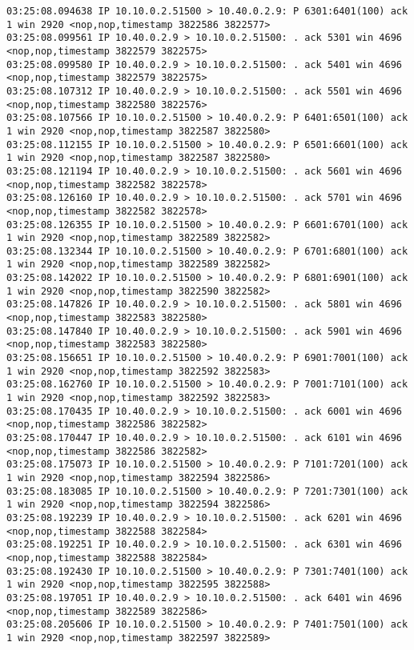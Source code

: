 \documentclass[a4paper,12pt]{article}
\begin{document}
\begin{lstlisting}
03:25:08.094638 IP 10.10.0.2.51500 > 10.40.0.2.9: P 6301:6401(100) ack 1 win 2920 <nop,nop,timestamp 3822586 3822577>
03:25:08.099561 IP 10.40.0.2.9 > 10.10.0.2.51500: . ack 5301 win 4696 <nop,nop,timestamp 3822579 3822575>
03:25:08.099580 IP 10.40.0.2.9 > 10.10.0.2.51500: . ack 5401 win 4696 <nop,nop,timestamp 3822579 3822575>
03:25:08.107312 IP 10.40.0.2.9 > 10.10.0.2.51500: . ack 5501 win 4696 <nop,nop,timestamp 3822580 3822576>
03:25:08.107566 IP 10.10.0.2.51500 > 10.40.0.2.9: P 6401:6501(100) ack 1 win 2920 <nop,nop,timestamp 3822587 3822580>
03:25:08.112155 IP 10.10.0.2.51500 > 10.40.0.2.9: P 6501:6601(100) ack 1 win 2920 <nop,nop,timestamp 3822587 3822580>
03:25:08.121194 IP 10.40.0.2.9 > 10.10.0.2.51500: . ack 5601 win 4696 <nop,nop,timestamp 3822582 3822578>
03:25:08.126160 IP 10.40.0.2.9 > 10.10.0.2.51500: . ack 5701 win 4696 <nop,nop,timestamp 3822582 3822578>
03:25:08.126355 IP 10.10.0.2.51500 > 10.40.0.2.9: P 6601:6701(100) ack 1 win 2920 <nop,nop,timestamp 3822589 3822582>
03:25:08.132344 IP 10.10.0.2.51500 > 10.40.0.2.9: P 6701:6801(100) ack 1 win 2920 <nop,nop,timestamp 3822589 3822582>
03:25:08.142022 IP 10.10.0.2.51500 > 10.40.0.2.9: P 6801:6901(100) ack 1 win 2920 <nop,nop,timestamp 3822590 3822582>
03:25:08.147826 IP 10.40.0.2.9 > 10.10.0.2.51500: . ack 5801 win 4696 <nop,nop,timestamp 3822583 3822580>
03:25:08.147840 IP 10.40.0.2.9 > 10.10.0.2.51500: . ack 5901 win 4696 <nop,nop,timestamp 3822583 3822580>
03:25:08.156651 IP 10.10.0.2.51500 > 10.40.0.2.9: P 6901:7001(100) ack 1 win 2920 <nop,nop,timestamp 3822592 3822583>
03:25:08.162760 IP 10.10.0.2.51500 > 10.40.0.2.9: P 7001:7101(100) ack 1 win 2920 <nop,nop,timestamp 3822592 3822583>
03:25:08.170435 IP 10.40.0.2.9 > 10.10.0.2.51500: . ack 6001 win 4696 <nop,nop,timestamp 3822586 3822582>
03:25:08.170447 IP 10.40.0.2.9 > 10.10.0.2.51500: . ack 6101 win 4696 <nop,nop,timestamp 3822586 3822582>
03:25:08.175073 IP 10.10.0.2.51500 > 10.40.0.2.9: P 7101:7201(100) ack 1 win 2920 <nop,nop,timestamp 3822594 3822586>
03:25:08.183085 IP 10.10.0.2.51500 > 10.40.0.2.9: P 7201:7301(100) ack 1 win 2920 <nop,nop,timestamp 3822594 3822586>
03:25:08.192239 IP 10.40.0.2.9 > 10.10.0.2.51500: . ack 6201 win 4696 <nop,nop,timestamp 3822588 3822584>
03:25:08.192251 IP 10.40.0.2.9 > 10.10.0.2.51500: . ack 6301 win 4696 <nop,nop,timestamp 3822588 3822584>
03:25:08.192430 IP 10.10.0.2.51500 > 10.40.0.2.9: P 7301:7401(100) ack 1 win 2920 <nop,nop,timestamp 3822595 3822588>
03:25:08.197051 IP 10.40.0.2.9 > 10.10.0.2.51500: . ack 6401 win 4696 <nop,nop,timestamp 3822589 3822586>
03:25:08.205606 IP 10.10.0.2.51500 > 10.40.0.2.9: P 7401:7501(100) ack 1 win 2920 <nop,nop,timestamp 3822597 3822589>

\end{lstlisting}
\end{document}
